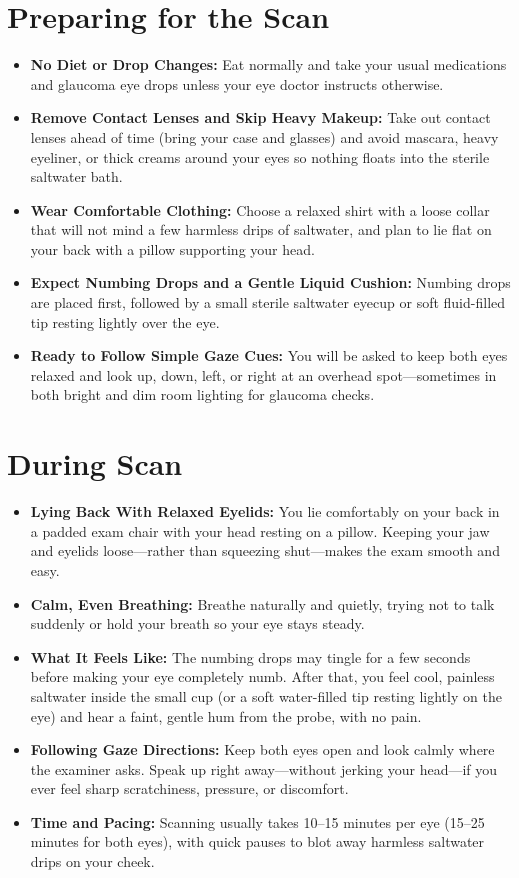 \section{Preparing for the Scan}

\begin{itemize}
    \item \textbf{No Diet or Drop Changes:} Eat normally and take your usual medications and glaucoma eye drops unless your eye doctor instructs otherwise.
    \item \textbf{Remove Contact Lenses and Skip Heavy Makeup:} Take out contact lenses ahead of time (bring your case and glasses) and avoid mascara, heavy eyeliner, or thick creams around your eyes so nothing floats into the sterile saltwater bath.
    \item \textbf{Wear Comfortable Clothing:} Choose a relaxed shirt with a loose collar that will not mind a few harmless drips of saltwater, and plan to lie flat on your back with a pillow supporting your head.
    \item \textbf{Expect Numbing Drops and a Gentle Liquid Cushion:} Numbing drops are placed first, followed by a small sterile saltwater eyecup or soft fluid-filled tip resting lightly over the eye.
    \item \textbf{Ready to Follow Simple Gaze Cues:} You will be asked to keep both eyes relaxed and look up, down, left, or right at an overhead spot---sometimes in both bright and dim room lighting for glaucoma checks.
\end{itemize}

\section{During Scan}

\begin{itemize}
    \item \textbf{Lying Back With Relaxed Eyelids:} You lie comfortably on your back in a padded exam chair with your head resting on a pillow. Keeping your jaw and eyelids loose---rather than squeezing shut---makes the exam smooth and easy.
    \item \textbf{Calm, Even Breathing:} Breathe naturally and quietly, trying not to talk suddenly or hold your breath so your eye stays steady.
    \item \textbf{What It Feels Like:} The numbing drops may tingle for a few seconds before making your eye completely numb. After that, you feel cool, painless saltwater inside the small cup (or a soft water-filled tip resting lightly on the eye) and hear a faint, gentle hum from the probe, with no pain.
    \item \textbf{Following Gaze Directions:} Keep both eyes open and look calmly where the examiner asks. Speak up right away---without jerking your head---if you ever feel sharp scratchiness, pressure, or discomfort.
    \item \textbf{Time and Pacing:} Scanning usually takes 10--15 minutes per eye (15--25 minutes for both eyes), with quick pauses to blot away harmless saltwater drips on your cheek.
\end{itemize}

